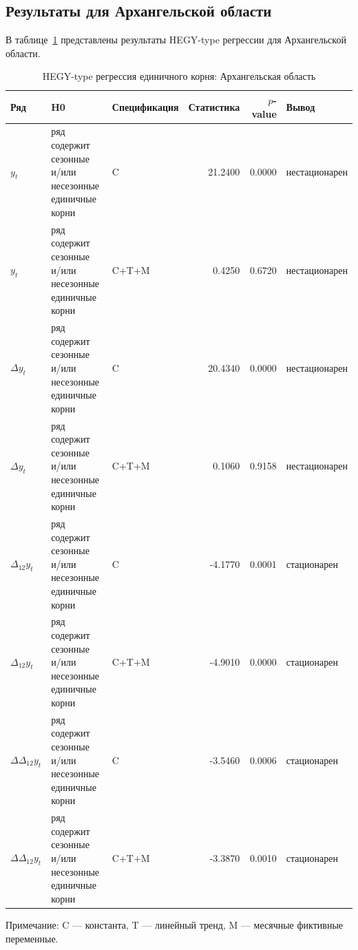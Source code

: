 \documentclass[12pt]{article}
\begin{document}
\subsection{Результаты для Архангельской области}
В таблице~\ref{tab:hegy_ark} представлены результаты HEGY-type регрессии для
Архангельской области.

\begin{table}[H]
\centering
\caption{HEGY-type регрессия единичного корня: Архангельская область}
\label{tab:hegy_ark}
\small
\begin{tabularx}{\textwidth}{l >{\RaggedRight\arraybackslash}p{4.3cm} l r r l}
\toprule
Ряд & H0 & Спецификация & Статистика & $p$-value & Вывод \\
\midrule
$y_t$ & \makecell[l]{ряд содержит сезонные\\и/или несезонные\\единичные корни} & C & 21.2400 & 0.0000 & нестационарен \\
$y_t$ & \makecell[l]{ряд содержит сезонные\\и/или несезонные\\единичные корни} & C+T+M & 0.4250 & 0.6720 & нестационарен \\
$\Delta y_t$ & \makecell[l]{ряд содержит сезонные\\и/или несезонные\\единичные корни} & C & 20.4340 & 0.0000 & нестационарен \\
$\Delta y_t$ & \makecell[l]{ряд содержит сезонные\\и/или несезонные\\единичные корни} & C+T+M & 0.1060 & 0.9158 & нестационарен \\
$\Delta_{12} y_t$ & \makecell[l]{ряд содержит сезонные\\и/или несезонные\\единичные корни} & C & -4.1770 & 0.0001 & стационарен \\
$\Delta_{12} y_t$ & \makecell[l]{ряд содержит сезонные\\и/или несезонные\\единичные корни} & C+T+M & -4.9010 & 0.0000 & стационарен \\
$\Delta \Delta_{12} y_t$ & \makecell[l]{ряд содержит сезонные\\и/или несезонные\\единичные корни} & C & -3.5460 & 0.0006 & стационарен \\
$\Delta \Delta_{12} y_t$ & \makecell[l]{ряд содержит сезонные\\и/или несезонные\\единичные корни} & C+T+M & -3.3870 & 0.0010 & стационарен \\
\bottomrule
\end{tabularx}
\par\smallskip
\small Примечание: C --- константа, T --- линейный тренд, M --- месячные
фиктивные переменные.
\end{table}
\end{document}
